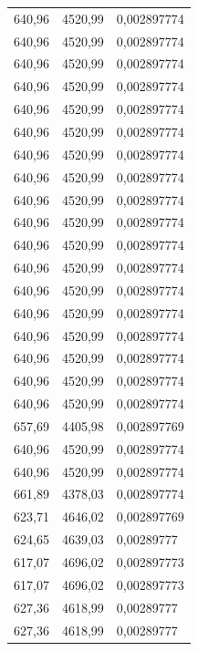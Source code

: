 \begin{center}
\begin{longtable}{|l|l|l|}
640,96            & 4520,99           & 0,002897774 \\
640,96            & 4520,99           & 0,002897774 \\
640,96            & 4520,99           & 0,002897774 \\
640,96            & 4520,99           & 0,002897774 \\
640,96            & 4520,99           & 0,002897774 \\
640,96            & 4520,99           & 0,002897774 \\
640,96            & 4520,99           & 0,002897774 \\
640,96            & 4520,99           & 0,002897774 \\
640,96            & 4520,99           & 0,002897774 \\
640,96            & 4520,99           & 0,002897774 \\
640,96            & 4520,99           & 0,002897774 \\
640,96            & 4520,99           & 0,002897774 \\
640,96            & 4520,99           & 0,002897774 \\
640,96            & 4520,99           & 0,002897774 \\
640,96            & 4520,99           & 0,002897774 \\
640,96            & 4520,99           & 0,002897774 \\
640,96            & 4520,99           & 0,002897774 \\
640,96            & 4520,99           & 0,002897774 \\
657,69            & 4405,98           & 0,002897769 \\
640,96            & 4520,99           & 0,002897774 \\
640,96            & 4520,99           & 0,002897774 \\
661,89            & 4378,03           & 0,002897774 \\
623,71            & 4646,02           & 0,002897769 \\
624,65            & 4639,03           & 0,00289777  \\
617,07            & 4696,02           & 0,002897773 \\
617,07            & 4696,02           & 0,002897773 \\
627,36            & 4618,99           & 0,00289777  \\
627,36            & 4618,99           & 0,00289777  \\

\end{longtable}
\end{center}
